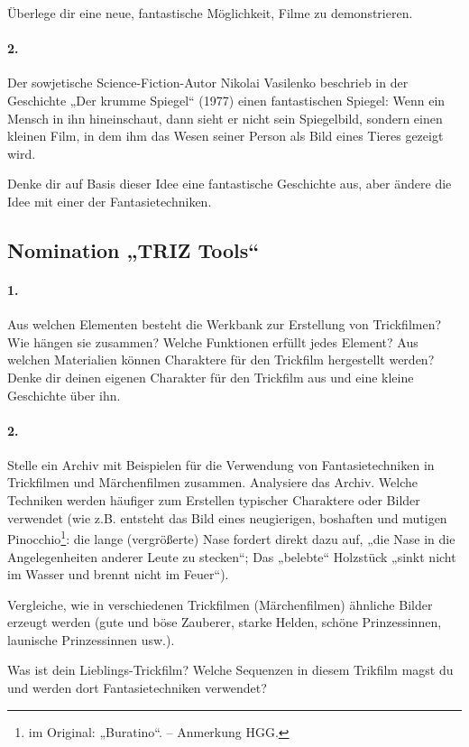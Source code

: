 \documentclass[11pt,a4paper]{article}
\begin{document}
Überlege dir eine neue, fantastische Möglichkeit, Filme zu demonstrieren.

\paragraph{2.}
Der sowjetische Science-Fiction-Autor Nikolai Vasilenko beschrieb in der
Geschichte „Der krumme Spiegel“ (1977) einen fantastischen Spiegel: Wenn ein
Mensch in ihn hineinschaut, dann sieht er nicht sein Spiegelbild, sondern
einen kleinen Film, in dem ihm das Wesen seiner Person als Bild eines Tieres
gezeigt wird.

Denke dir auf Basis dieser Idee eine fantastische Geschichte aus, aber ändere
die Idee mit einer der Fantasietechniken.

\subsection*{Nomination „TRIZ Tools“}

\paragraph{1.}
Aus welchen Elementen besteht die Werkbank zur Erstellung von Trickfilmen? Wie
hängen sie zusammen?  Welche Funktionen erfüllt jedes Element?  Aus welchen
Materialien können Charaktere für den Trickfilm hergestellt werden?  Denke dir
deinen eigenen Charakter für den Trickfilm aus und eine kleine Geschichte über
ihn.

\paragraph{2.}
Stelle ein Archiv mit Beispielen für die Verwendung von Fantasietechniken in
Trickfilmen und Märchenfilmen zusammen. Analysiere das Archiv. Welche
Techniken werden häufiger zum Erstellen typischer Charaktere oder Bilder
verwendet (wie z.B. entsteht das Bild eines neugierigen, boshaften und mutigen
Pinocchio\footnote{im Original: „Buratino“. -- Anmerkung HGG.}: die lange
(vergrößerte) Nase fordert direkt dazu auf, „die Nase in die Angelegenheiten
anderer Leute zu stecken“; Das „belebte“ Holzstück „sinkt nicht im Wasser und
brennt nicht im Feuer“).

Vergleiche, wie in verschiedenen Trickfilmen (Märchenfilmen) ähnliche Bilder
erzeugt werden (gute und böse Zauberer, starke Helden, schöne Prinzessinnen,
launische Prinzessinnen usw.).

Was ist dein Lieblings-Trickfilm? Welche Sequenzen in diesem Trikfilm magst du
und werden dort Fantasietechniken verwendet?
\end{document}
